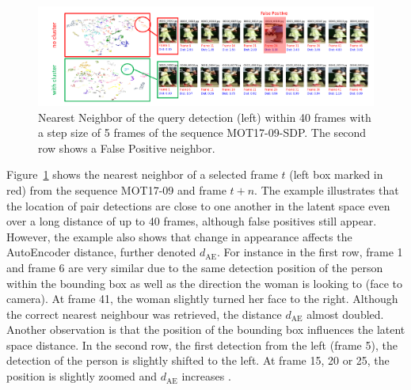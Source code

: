 \begin{figure}[t]
	\begin{center}
		\includegraphics[width=1.0\linewidth]{Fig_4_figure.pdf}
	\end{center}
	\caption{Nearest Neighbor of the query detection (left) within 40  frames with a step size of 5 frames of the sequence MOT17-09-SDP. The second row shows a False Positive neighbor. }
	\label{fig:figure3}
\end{figure}

Figure~\ref{fig:figure3} shows the nearest neighbor of a selected frame $t$ (left box marked in red) from the sequence MOT17-09 and frame $t+n$. 
The example illustrates that the location of pair detections are close to one another in the latent space even over a long distance of up to 40 frames, although false positives still appear. 
However, the example also shows that change in appearance affects the AutoEncoder distance, further denoted $d_{\mathrm{AE}}$. 
For instance in the first row, frame 1 and frame 6 are very similar due to the same detection position of the person within the bounding box as well as the direction the woman is looking to (face to camera). 
At frame 41, the woman  slightly turned her face to the right. 
Although the correct nearest neighbour was retrieved, the distance $d_{\mathrm{AE}}$ almost doubled.
Another observation is that the position of the bounding box influences the latent space distance.
In the second row, the first detection from the left (frame 5), the detection of the person is slightly shifted to the left. 
At frame 15, 20 or 25, the position is slightly zoomed and $d_{\mathrm{AE}}$ increases .

